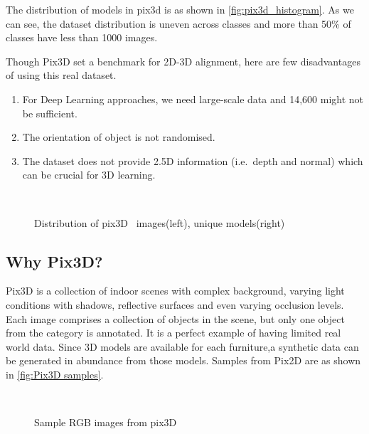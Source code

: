 The distribution of models in pix3d is as shown in \autoref{fig:pix3d_histogram}.
As we can see, the dataset distribution is uneven across classes and more than 50\% of classes have less than 1000 images.

Though Pix3D set a benchmark for 2D-3D alignment, here are few disadvantages of using this real dataset.
\begin{enumerate}
    \item For Deep Learning approaches, we need large-scale data and 14,600 might not be sufficient.
    \item The orientation of object is not randomised.
    \item The dataset does not provide 2.5D information (i.e.\ depth and normal) which can be crucial for 3D learning.
\end{enumerate}

\begin{figure}[!ht]
    \centering
    \quad
    \\
    \caption{Distribution of pix3D~\cite{pix3d} images(left), unique models(right)}
    \label{fig:pix3d_histogram}
\end{figure}

\subsection{Why Pix3D?}\label{subsec:why-pix3d?}
Pix3D is a collection of indoor scenes with complex background, varying light conditions with shadows, reflective surfaces and even varying occlusion levels.
Each image comprises a collection of objects in the scene, but only one object from the category is annotated.
It is a perfect example of having limited real world data.
Since 3D models are available for each furniture,a synthetic data can be generated in abundance from those models.
Samples from Pix2D are as shown in \autoref{fig:Pix3D samples}.

\begin{figure}[!ht]
    \centering
    \quad
    \\
    \quad
    \caption{Sample RGB images from pix3D}
    \label{fig:Pix3D samples}
\end{figure}

